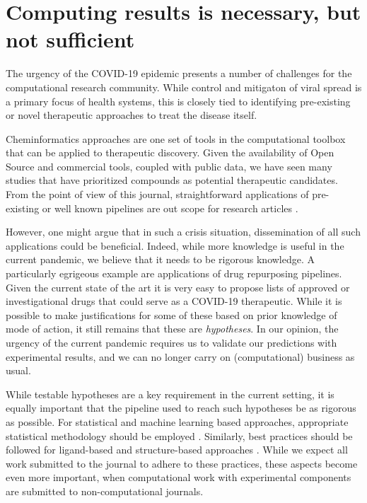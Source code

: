 \documentclass{bmcart}
\begin{document}
\section*{Computing results is necessary, but not sufficient}

The urgency of the COVID-19 epidemic presents a number of challenges
for the computational research community. While control and mitigaton
of viral spread is a primary focus of health systems, this is closely
tied to identifying pre-existing or novel therapeutic approaches to
treat the disease itself.

Cheminformatics approaches are one set of tools in the computational
toolbox that can be applied to therapeutic discovery. Given the
availability of Open Source and commercial tools, coupled with public
data, we have seen many studies that have prioritized compounds as
potential therapeutic candidates. From the point of view of this
journal, straightforward applications of pre-existing or well known
pipelines are out scope for research articles \cite{jcheminf_scope}.

However, one might argue that in such a crisis situation,
dissemination of all such applications could be beneficial. Indeed,
while more knowledge is useful in the current pandemic, we believe
that it needs to be rigorous knowledge. A particularly egrigeous
example are applications of drug repurposing pipelines. Given the
current state of the art it is very easy to propose lists of approved
or investigational drugs that could serve as a COVID-19
therapeutic. While it is possible to make justifications for some of
these based on prior knowledge of mode of action, it still remains
that these are \emph{hypotheses}. In our opinion, the urgency of the
current pandemic requires us to validate our predictions with
experimental results, and we can no longer carry on (computational)
business as usual.

While testable hypotheses are a key requirement in the current
setting, it is equally important that the pipeline used to reach such
hypotheses be as rigorous as possible. For statistical and machine
learning based approaches, appropriate statistical methodology should
be employed \cite{cc_stats_1,cc_stats_2, cc_stats_3}. Similarly, best
practices should be followed for ligand-based \cite{qsar_1, qsar_2}
and structure-based approaches \cite{sbdd_1, sbdd_2}. While we expect
all work submitted to the journal to adhere to these practices, these aspects
become even more important, when computational work with experimental
components are submitted to non-computational journals.
\end{document}
